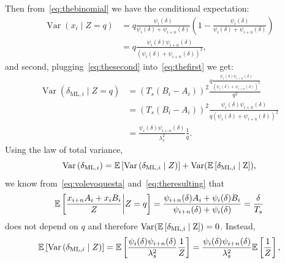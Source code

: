 \noindent
Then from~\eqref{eq:thebinomial} we have the conditional expectation:
\begin{equation}
\begin{aligned}
\operatorname{Var}(x_i \mid Z =q)
& = q\frac{\psi_{i}(\delta)}{\psi_{i}(\delta)+\psi_{i+n}(\delta)}
\left(
1-\frac{\psi_{i}(\delta)}{\psi_{i}(\delta)+\psi_{i+n}(\delta)}
\right)\\
& = q\frac{\psi_{i}(\delta)\psi_{i+n}(\delta)}{(\psi_{i}(\delta)+\psi_{i+n}(\delta))^2},
\end{aligned}
\label{eq:thesecond}
\end{equation}
and second, plugging~\eqref{eq:thesecond} into~\eqref{eq:thefirst} we get: 
\begin{equation}
\begin{aligned}
\operatorname{Var}\left(\delta_{\mathrm{ML}, i}\mid Z=q\right)
& =\left(T_s(B_i-A_i)\right)^2
\frac{q\frac{\psi_{i}(\delta)\psi_{i+n}(\delta)}{(\psi_{i}(\delta)+\psi_{i+n}(\delta))^2}}{q^2}\\
& =  \left(T_s(B_i-A_i)\right)^2\frac{\psi_{i}(\delta)\psi_{i+n}(\delta)}{q(\psi_{i}(\delta)+\psi_{i+n}(\delta))^2}\\
& =  \frac{\psi_i(\delta) \psi_{i+n}(\delta)}{\lambda_s^2}\frac{1}{q}.
\end{aligned}
\end{equation}
Using the law of total variance,
\begin{equation}
\operatorname{Var}\left(\delta_{\mathrm{ML},i}\right)
=\mathbb{E}\left[{\operatorname{Var}\left(\delta_{\mathrm{ML}, i}\mid Z\right)}\right]
+ \operatorname{Var(\mathbb{E}\left[{\delta_{\mathrm{ML},i}\mid Z}\right])},
\end{equation}
we know from~\eqref{eq:volevoquesta} and~\eqref{eq:theresulting} that
\begin{equation}
\begin{aligned}
\mathbb{E}\left[{\frac{x_{i+n}A_i+x_iB_i}{Z}\bigg|Z=q}\right]=
\frac{\psi_{i+n}(\delta)A_i+\psi_{i}(\delta)B_i}{\psi_{i+n}(\delta)+\psi_{i}(\delta)}
=\frac{\delta}{T_s}
\end{aligned}
\end{equation}
does not depend on \(q\) and therefore \(\operatorname{Var(\mathbb{E}\left[{\delta_{\mathrm{ML},i}\mid Z}\right])}=0\). Instead,
\begin{equation}
\begin{aligned}
\mathbb{E}\left[{\operatorname{Var}\left(\delta_{\mathrm{ML}, i}\mid Z\right)}\right]
=
\mathbb{E}\left[{\frac{\psi_i(\delta) \psi_{i+n}(\delta)}{\lambda_s^2}\frac{1}{Z}}\right]
=
\frac{\psi_i(\delta) \psi_{i+n}(\delta)}{\lambda_s^2}\mathbb{E}\left[{\frac{1}{Z}}\right],
\end{aligned}
\end{equation}
